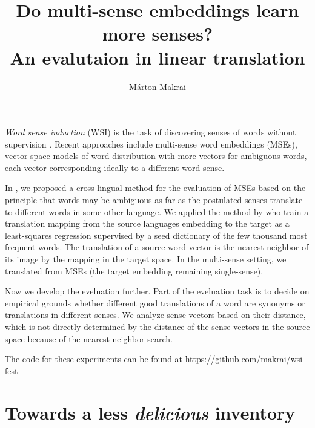 \documentclass[11pt]{article}
\title{Do multi-sense embeddings learn more senses? \\ An evalutaion in linear
translation}
\author{
  Márton Makrai
}
\date{}
\begin{document}
\maketitle



\emph{Word sense induction} (WSI) is the task of discovering senses of words
without supervision \citep{Schutze:1998}. Recent approaches include multi-sense
word embeddings (MSEs), vector space models of word distribution with more
vectors for ambiguous words, each vector corresponding ideally to a different
word sense.

In \cite{Borbely:2016}, we proposed a cross-lingual method for the evaluation
of MSEs based on the principle that words may be ambiguous as far as the
postulated senses translate to different words in some other language.  We
applied the method by \citet{Mikolov:2013x} who train a translation mapping
from the source languages embedding to the target as a least-squares regression
supervised by a seed dictionary of the  few thousand most frequent words. The
translation of a source word vector is the nearest neighbor of its image by the
mapping in the target space. In the multi-sense setting, we translated from
MSEs (the target embedding remaining single-sense).

Now we develop the eveluation further. Part of the eveluation task is to decide
on empirical grounds whether different good translations of a word are synonyms
or translations in different senses.  We analyze sense vectors based on their
distance, which is not directly determined by the distance of the sense vectors
in the source space because of the nearest neighbor search.

The code for these experiments can be found at
\url{https://github.com/makrai/wsi-fest}

\section{Towards a less \emph{delicious} inventory}
\end{document}
